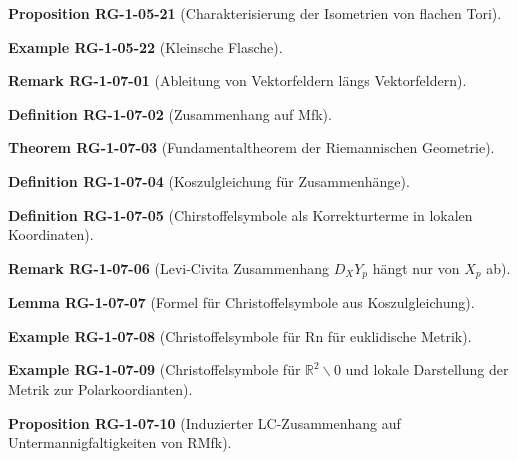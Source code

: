 \documentclass[10pt, letterpaper]{article}
\newcommand{\R}{\mathbb{R}}
\newcommand{\CustomHeading}[3]{%
  \par\medskip\noindent%
  \textbf{#1 #2} \textnormal{(#3)}.\enskip%
}
\newenvironment{DEF}[2]{\CustomHeading{Definition}{#1}{#2}}{}
\newenvironment{PROP}[2]{\CustomHeading{Proposition}{#1}{#2}}{}
\newenvironment{THEO}[2]{\CustomHeading{Theorem}{#1}{#2}}{}
\newenvironment{LEM}[2]{\CustomHeading{Lemma}{#1}{#2}}{}
\newenvironment{REM}[2]{\CustomHeading{Remark}{#1}{#2}}{}
\newenvironment{EXA}[2]{\CustomHeading{Example}{#1}{#2}}{}
\begin{document}
\begin{PROP}{RG-1-05-21}{Charakterisierung der Isometrien von flachen Tori}
\end{PROP}

\begin{EXA}{RG-1-05-22}{Kleinsche Flasche}
\end{EXA}

\begin{REM}{RG-1-07-01}{Ableitung von Vektorfeldern längs Vektorfeldern}
\end{REM}

\begin{DEF}{RG-1-07-02}{Zusammenhang auf Mfk}
\end{DEF}

\begin{THEO}{RG-1-07-03}{Fundamentaltheorem der Riemannischen Geometrie}
\end{THEO}

\begin{DEF}{RG-1-07-04}{Koszulgleichung für Zusammenhänge}
\end{DEF}

\begin{DEF}{RG-1-07-05}{Chirstoffelsymbole als Korrekturterme in lokalen Koordinaten}
\end{DEF}

\begin{REM}{RG-1-07-06}{Levi-Civita Zusammenhang $D_XY_p$ hängt nur von $X_p$ ab}
\end{REM}

\begin{LEM}{RG-1-07-07}{Formel für Christoffelsymbole aus Koszulgleichung}
\end{LEM}

\begin{EXA}{RG-1-07-08}{Christoffelsymbole für Rn für euklidische Metrik}
\end{EXA}

\begin{EXA}{RG-1-07-09}{Christoffelsymbole für $\R^2\backslash 0$ und lokale Darstellung der Metrik zur Polarkoordianten}
\end{EXA}

\begin{PROP}{RG-1-07-10}{Induzierter LC-Zusammenhang auf Untermannigfaltigkeiten von RMfk}
\end{PROP}
\end{document}
